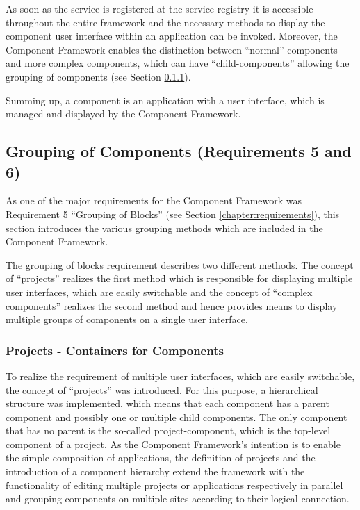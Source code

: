 As soon as the service is registered at the service registry it is accessible throughout the entire
framework and the necessary methods to display the component user interface within an application
can be invoked. Moreover, the Component Framework enables the distinction between ``normal''
components and more complex components, which can have ``child-components'' allowing the grouping
of components (see Section \ref{sec:project}).

Summing up, a component is an application with a user interface, which is managed and displayed by
the Component Framework.

\subsection{Grouping of Components (Requirements 5 and 6)}

As one of the major requirements for the Component Framework was Requirement 5 ``Grouping of
Blocks'' (see Section \ref{chapter:requirements}), this section introduces the various grouping
methods which are included in the Component Framework.

The grouping of blocks requirement describes two different methods. The concept of ``projects''
realizes the first method which is responsible for displaying multiple user interfaces, which are
easily switchable and the concept of ``complex components'' realizes the second method and hence
provides means to display multiple groups of components on a single user interface.

\subsubsection{Projects - Containers for Components}
\label{sec:project}
To realize the requirement of multiple user interfaces, which are easily switchable, the concept of
``projects'' was introduced. For this purpose, a hierarchical structure was implemented, which means
that each component has a parent component and possibly one or multiple child components. The only
component that has no parent is the so-called project-component, which is the top-level component of
a project. As the Component Framework's intention is to enable the simple composition of
applications, the definition of projects and the introduction of a component hierarchy extend the
framework with the functionality of editing multiple projects or applications respectively in
parallel and grouping components on multiple sites according to their logical connection.

